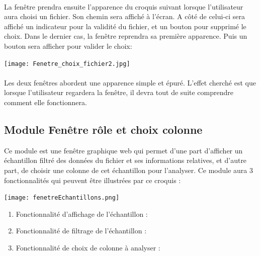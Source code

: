\begin{enumerate}
				\paragraph{}La fenêtre prendra ensuite l'apparence du croquis suivant lorsque l'utilisateur aura choisi un fichier. Son chemin sera affiché à l'écran. A côté de celui-ci sera affiché un indicateur pour la validité du fichier, et un bouton pour supprimé le choix. Dans le dernier cas, la fenêtre reprendra sa première apparence. Puis un bouton sera afficher pour valider le choix:
					
					\begin{center}\texttt{[image: Fenetre\_choix\_fichier2.jpg]}\end{center}
				\paragraph{}Les deux fenêtres abordent une apparence simple et épuré. L'effet cherché est que lorsque l'utilisateur regardera la fenêtre, il devra tout de suite comprendre comment elle fonctionnera.

			\end{enumerate}
			
		\subsection{Module Fenêtre rôle et choix colonne}
			Ce module est une fenêtre graphique web qui permet d'une part d'afficher un échantillon filtré des données du fichier et ses informations relatives, et d'autre part, de choisir une colonne de cet échantillon pour l'analyser. Ce module aura 3 fonctionnalités qui peuvent être illustrées par ce croquis :
			\begin{center}\texttt{[image: fenetreEchantillons.png]}\end{center}
			\begin{enumerate}
				\vspace{1em}\item Fonctionnalité d'affichage de l'échantillon :
				\vspace{1em}\item Fonctionnalité de filtrage de l'échantillon :
				\vspace{1em}\item Fonctionnalité de choix de colonne à analyser :
			\end{enumerate}
			
			
